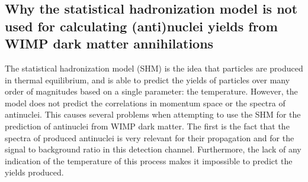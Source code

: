 \subsection{Why the statistical hadronization model is not used for calculating (anti)nuclei yields from WIMP dark matter annihilations}\label{App:statHadronModel}
The statistical hadronization model (SHM) \cite{statHadronModel_review_2009} is the idea that particles are produced in thermal equilibrium, and is able to predict the yields of particles over many order of magnitudes based on a single parameter: the temperature. However, the model does not predict the correlations in momentum space or the spectra of antinuclei. This causes several problems when attempting to use the SHM for the prediction of antinuclei from WIMP dark matter. The first is the fact that the spectra of produced antinuclei is very relevant for their propagation and for the signal to background ratio in this detection channel. Furthermore, the lack of any indication of the temperature of this process makes it impossible to predict the yields produced. 
